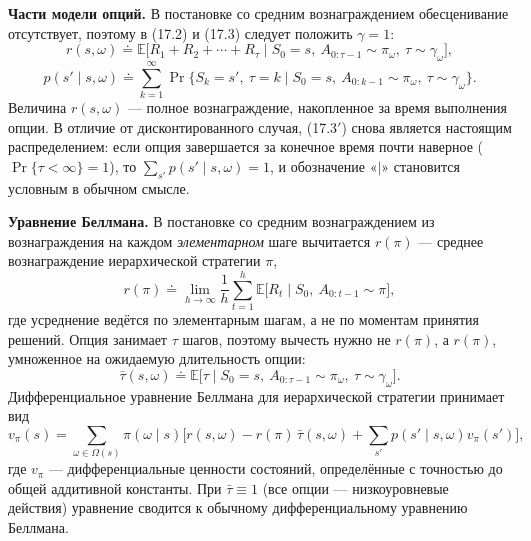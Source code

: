 \begin{solution}
    \textbf{Части модели опций.} В постановке со средним вознаграждением
    обесценивание отсутствует, поэтому в (17.2) и (17.3) следует положить
    $\gamma=1$:
    \begin{equation}
        r(s,\omega) \doteq \mathbb E\big[R_1+R_2+\cdots+R_\tau
        \mid S_0=s,\ A_{0:\tau-1}\sim\pi_\omega,\ \tau\sim\gamma_\omega\big],
        \tag{17.2$'$}
    \end{equation}
    \begin{equation}
        p(s'\mid s,\omega) \doteq \sum_{k=1}^{\infty}
        \Pr\{S_k=s',\ \tau=k\mid S_0=s,\ A_{0:k-1}\sim\pi_\omega,\ \tau\sim\gamma_\omega\}.
        \tag{17.3$'$}
    \end{equation}
    Величина $r(s,\omega)$ --- полное вознаграждение, накопленное за время
    выполнения опции. В отличие от дисконтированного случая, (17.3$'$) снова
    является настоящим распределением: если опция завершается за конечное время
    почти наверное ($\Pr\{\tau<\infty\}=1$), то $\sum_{s'}p(s'\mid s,\omega)=1$,
    и обозначение «$\mid$» становится условным в обычном смысле.

    \textbf{Уравнение Беллмана.} В постановке со средним вознаграждением из
    вознаграждения на каждом \emph{элементарном} шаге вычитается $r(\pi)$ ---
    среднее вознаграждение иерархической стратегии $\pi$,
    \[
        r(\pi) \doteq \lim_{h\to\infty}\frac1h\sum_{t=1}^{h}
        \mathbb E\big[R_t\mid S_0,\ A_{0:t-1}\sim\pi\big],
    \]
    где усреднение ведётся по элементарным шагам, а не по моментам принятия
    решений. Опция занимает $\tau$ шагов, поэтому вычесть нужно не $r(\pi)$, а
    $r(\pi)$, умноженное на ожидаемую длительность опции:
    \begin{equation}
        \bar\tau(s,\omega) \doteq \mathbb E\big[\tau\mid S_0=s,\ A_{0:\tau-1}\sim\pi_\omega,\ \tau\sim\gamma_\omega\big].
        \tag{17.6}
    \end{equation}
    Дифференциальное уравнение Беллмана для иерархической стратегии принимает вид
    \begin{equation}
        v_\pi(s) = \sum_{\omega\in\Omega(s)}\pi(\omega\mid s)
        \Big[r(s,\omega)-r(\pi)\,\bar\tau(s,\omega)+\sum_{s'}p(s'\mid s,\omega)v_\pi(s')\Big],
        \tag{17.4$'$}
    \end{equation}
    где $v_\pi$ --- дифференциальные ценности состояний, определённые с точностью
    до общей аддитивной константы. При $\bar\tau\equiv 1$ (все опции ---
    низкоуровневые действия) уравнение сводится к обычному дифференциальному
    уравнению Беллмана.
\end{solution}

